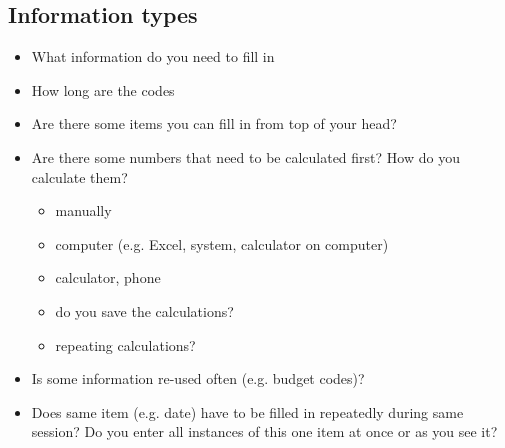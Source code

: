 \subsection{Information types}
\begin{itemize}
\item What information do you need to fill in
\item How long are the codes
\item Are there some items you can fill in from top of your head?
\item Are there some numbers that need to be calculated first? How do you calculate them?
\begin{itemize}
\item manually
\item computer (e.g. Excel, system, calculator on computer)
\item calculator, phone
\item do you save the calculations?
\item repeating calculations?
	\end{itemize}
\item Is some information re-used often (e.g. budget codes)?
\item Does same item (e.g. date) have to be filled in repeatedly during same session? Do you enter all instances of this one item at once or as you see it?
\end{itemize}

